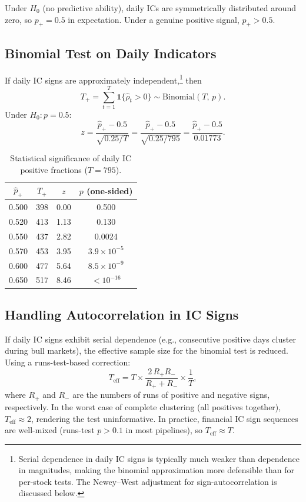 \documentclass[11pt,a4paper]{article}
\theoremstyle{definition}
\newcommand{\Ho}{H_{0}}
\begin{document}
Under $\Ho$ (no predictive ability), daily ICs are symmetrically
distributed around zero, so $p_{+} = 0.5$ in expectation. Under a
genuine positive signal, $p_{+} > 0.5$.

\subsection{Binomial Test on Daily Indicators}

If daily IC signs are approximately independent,\footnote{Serial
dependence in daily IC signs is typically much weaker than dependence
in magnitudes, making the binomial approximation more defensible than
for per-stock tests. The Newey--West adjustment for sign-autocorrelation
is discussed below.} then
\begin{equation}
    T_{+} = \sum_{t=1}^{T} \mathbf{1}\{\hat{\rho}_{t} > 0\}
          \sim \text{Binomial}(T,\,p).
    \label{eq:binomial_daily}
\end{equation}
Under $\Ho: p = 0.5$:
\begin{equation}
    z = \frac{\hat{p}_{+} - 0.5}{\sqrt{0.25/T}}
      = \frac{\hat{p}_{+} - 0.5}{\sqrt{0.25/795}}
      = \frac{\hat{p}_{+} - 0.5}{0.01773}.
    \label{eq:z_daily}
\end{equation}

\begin{table}[htbp]
\centering
\caption{Statistical significance of daily IC positive fractions
         ($T=795$).}
\label{tab:daily_pos}
\begin{tabular}{cccc}
\toprule
$\hat{p}_{+}$ & $T_{+}$ & $z$ & $p$ (one-sided) \\
\midrule
0.500 & 398 & 0.00 & 0.500 \\
0.520 & 413 & 1.13 & 0.130 \\
0.550 & 437 & 2.82 & 0.0024 \\
0.570 & 453 & 3.95 & $3.9\times10^{-5}$ \\
0.600 & 477 & 5.64 & $8.5\times10^{-9}$ \\
0.650 & 517 & 8.46 & $<10^{-16}$ \\
\bottomrule
\end{tabular}
\end{table}

\subsection{Handling Autocorrelation in IC Signs}

If daily IC signs exhibit serial dependence (e.g., consecutive positive
days cluster during bull markets), the effective sample size for the
binomial test is reduced. Using a runs-test-based correction:
\begin{equation}
    T_{\text{eff}} = T \times
    \frac{2\,R_{+}R_{-}}{R_{+}+R_{-}} \times \frac{1}{T},
\end{equation}
where $R_{+}$ and $R_{-}$ are the numbers of runs of positive and
negative signs, respectively. In the worst case of complete clustering
(all positives together), $T_{\text{eff}} \approx 2$, rendering the
test uninformative. In practice, financial IC sign sequences are
well-mixed (runs-test $p > 0.1$ in most pipelines), so $T_{\text{eff}}
\approx T$.
\end{document}
